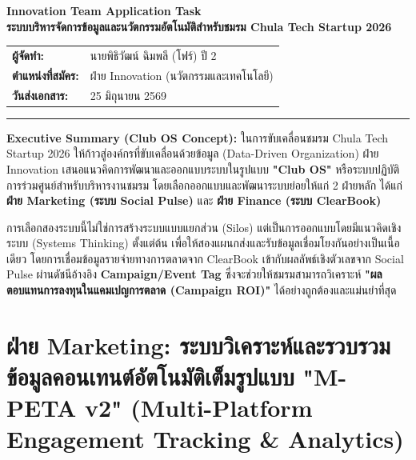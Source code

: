 \documentclass[10pt,a4paper]{article}
\begin{document}
\begin{center}
  \vspace*{0.3cm}
  {\Huge\bfseries\chulafont\color{chulapink} Innovation Team Application Task}\\[0.2cm]
  {\Large\bfseries\chulafont\color{darkblue} ระบบบริหารจัดการข้อมูลและนวัตกรรมอัตโนมัติสำหรับชมรม Chula Tech Startup 2026}\\[0.4cm]
  \begin{tabular}{ll}
    \textbf{ผู้จัดทำ:} & นายพิธิวัฒน์ ฉิมพลี (โฟร์) ปี 2 \\
    \textbf{ตำแหน่งที่สมัคร:} & ฝ่าย Innovation (นวัตกรรมและเทคโนโลยี) \\
    \textbf{วันส่งเอกสาร:} & 25 มิถุนายน 2569 \\
  \end{tabular}
  \vskip 0.4cm
  \hrule
\end{center}

\begin{highlightbox}
  \noindent \textbf{Executive Summary (Club OS Concept):} 
  ในการขับเคลื่อนชมรม Chula Tech Startup 2026 ให้ก้าวสู่องค์กรที่ขับเคลื่อนด้วยข้อมูล (Data-Driven Organization) ฝ่าย Innovation เสนอแนวคิดการพัฒนาและออกแบบระบบในรูปแบบ \textbf{"Club OS"} หรือระบบปฏิบัติการร่วมศูนย์สำหรับบริหารงานชมรม โดยเลือกออกแบบและพัฒนาระบบย่อยให้แก่ 2 ฝ่ายหลัก ได้แก่ \textbf{ฝ่าย Marketing (ระบบ Social Pulse)} และ \textbf{ฝ่าย Finance (ระบบ ClearBook)} 

  การเลือกสองระบบนี้ไม่ใช่การสร้างระบบแบบแยกส่วน (Silos) แต่เป็นการออกแบบโดยมีแนวคิดเชิงระบบ (Systems Thinking) ตั้งแต่ต้น เพื่อให้สองแผนกส่งและรับข้อมูลเชื่อมโยงกันอย่างเป็นเนื้อเดียว โดยการเชื่อมข้อมูลรายจ่ายทางการตลาดจาก ClearBook เข้ากับผลลัพธ์เชิงตัวเลขจาก Social Pulse ผ่านดัชนีอ้างอิง \textbf{Campaign/Event Tag} ซึ่งจะช่วยให้ชมรมสามารถวิเคราะห์ \textbf{"ผลตอบแทนการลงทุนในแคมเปญการตลาด (Campaign ROI)"} ได้อย่างถูกต้องและแม่นยำที่สุด
\end{highlightbox}

\section{ฝ่าย Marketing: ระบบวิเคราะห์และรวบรวมข้อมูลคอนเทนต์อัตโนมัติเต็มรูปแบบ "M-PETA v2" (Multi-Platform Engagement Tracking \& Analytics)}
\end{document}
